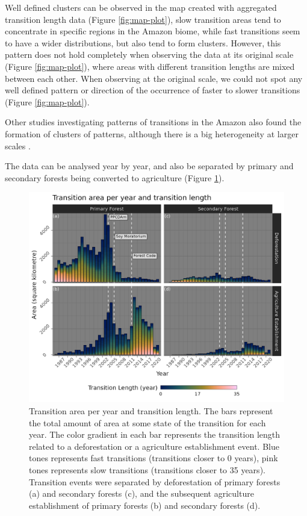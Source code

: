 \documentclass[essd, manuscript]{copernicus}
\begin{document}
Well defined clusters can be observed in the map created with aggregated transition length data (Figure \ref{fig:map-plot}), slow transition areas tend to concentrate in specific regions in the Amazon biome, while fast transitions seem to have a wider distributions, but also tend to form clusters.
However, this pattern does not hold completely when observing the data at its original scale (Figure \ref{fig:map-plot}), where areas with different transition lengths are mixed between each other.
When observing at the original scale, we could not spot any well defined pattern or direction of the occurrence of faster to slower transitions (Figure \ref{fig:map-plot}).

Other studies investigating patterns of transitions in the Amazon also found the formation of clusters of patterns, although there is a big heterogeneity at larger scales \citep{MullerHansen2017}.

The data can be analysed year by year, and also be separated by primary and secondary forests being converted to agriculture (Figure \ref{fig:transbar-plot}).

\begin{figure}[ht]
\includegraphics[width=17cm]{figs/trans_length_cols} \caption{Transition area per year and transition length. The bars represent the total amount of area at some state of the transition for each year. The color gradient in each bar represents the transition length related to a deforestation or a agriculture establishment event. Blue tones represents fast transitions (transitions closer to 0 years), pink tones represents slow transitions (transitions closer to 35 years). Transition events were separated by deforestation of primary forests (a) and secondary forests (c), and the subsequent  agriculture establishment of primary forests (b) and secondary forests (d).}\label{fig:transbar-plot}
\end{figure}
\end{document}
